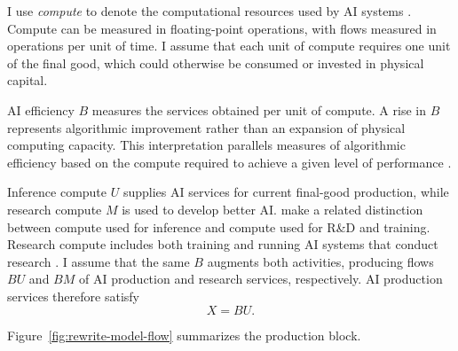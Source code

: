 I use \emph{compute} to denote the computational resources used by AI systems \citep{sastryetal2024}. %
Compute can be measured in
floating-point operations, with flows measured in operations per unit
of time. I assume that each unit of compute requires one unit of the
final good, which could otherwise be consumed or invested in physical
capital.

AI efficiency $B$ measures the services obtained per unit of compute.
A rise in $B$ represents algorithmic improvement rather than an
expansion of physical computing capacity. This interpretation parallels
measures of algorithmic efficiency based on the compute required to
achieve a given level of performance
\citep{hernandezbrown2020,erdilbesiroglu2022}.

Inference compute $U$ supplies AI services for current final-good
production, while research compute $M$ is used to develop better AI.
\citet{korinekmckelvey2026} make a related distinction between compute
used for inference and compute used for R\&D and training. Research
compute includes both training and running AI systems that conduct
research \citep{davidsonetal2026}. %
I assume that the same $B$ augments
both activities, producing flows $BU$ and $BM$ of AI production and
research services, respectively. AI production services therefore
satisfy
\begin{equation}
 X=BU.
 \label{eq:rewrite-ai-service}
\end{equation}


Figure~\ref{fig:rewrite-model-flow} summarizes the production block.


